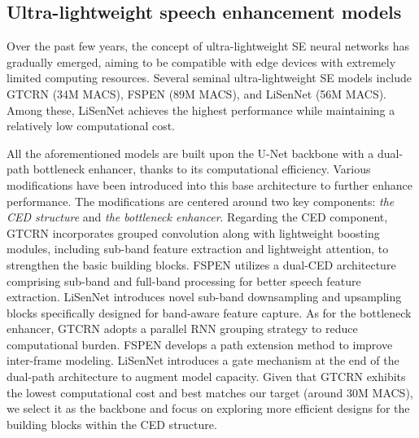 \documentclass[journal]{IEEEtran}
\newcommand{\rev}[1]{#1}
\begin{document}
\subsection{Ultra-lightweight speech enhancement models}
Over the past few years, the concept of ultra-lightweight SE neural networks has gradually emerged, aiming to be compatible with edge devices with extremely limited computing resources. 
\rev{Several seminal ultra-lightweight SE models include GTCRN \cite{GTCRN} (34M MACS), FSPEN \cite{FSPEN} (89M MACS), and LiSenNet \cite{LiSenNet} (56M MACS). Among these, LiSenNet achieves the highest performance while maintaining a relatively low computational cost.}

All the aforementioned models are built upon the U-Net backbone with a dual-path bottleneck enhancer, thanks to its computational efficiency. Various modifications have been introduced into this base architecture to further enhance performance. The modifications are centered around two key components: \textit{the CED structure} and \textit{the bottleneck enhancer}. Regarding the CED component, GTCRN incorporates grouped convolution along with lightweight boosting modules, including sub-band feature extraction and lightweight attention, to strengthen the basic building blocks. FSPEN utilizes a dual-CED architecture comprising sub-band and full-band processing for better speech feature extraction. LiSenNet introduces novel sub-band downsampling and upsampling blocks specifically designed for band-aware feature capture. As for the bottleneck enhancer, GTCRN adopts a parallel RNN grouping strategy to reduce computational burden. FSPEN develops a path extension method to improve inter-frame modeling. LiSenNet introduces a gate mechanism at the end of the dual-path architecture to augment model capacity.
\rev{Given that GTCRN exhibits the lowest computational cost and best matches our target (around 30M MACS), we select it as the backbone} and focus on exploring more efficient designs for the building blocks within the CED structure.
\end{document}
